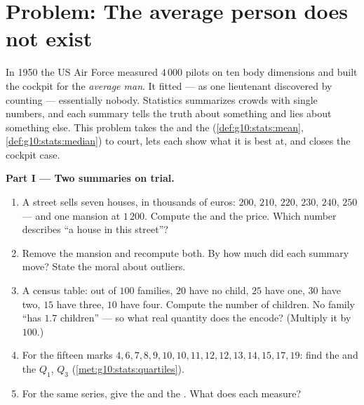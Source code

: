 \section{Problem: The average person does not exist}

\begin{problem}
\label{pb:g10:stats:1}
In 1950 the US Air Force measured $4\,000$ pilots on ten body
dimensions and built the cockpit for the \emph{average man}. It
fitted --- as one lieutenant discovered by counting --- essentially
nobody. Statistics summarizes crowds with single numbers, and each
summary tells the truth about something and lies about something
else. This problem takes the  and the 
(\cref{def:g10:stats:mean}, \cref{def:g10:stats:median}) to court,
lets each show what it is best at, and closes the cockpit case.

\medskip
\noindent\textbf{Part I --- Two summaries on trial.}
\begin{enumerate}
  \item A street sells seven houses, in thousands of euros:
        $200$, $210$, $220$, $230$, $240$, $250$ --- and one
        mansion at $1\,200$. Compute the  and the 
        price. Which number describes ``a house in this street''?
  \item Remove the mansion and recompute both. By how much did
        each summary move? State the moral about outliers.
  \item A census table: out of $100$ families, $20$ have no
        child, $25$ have one, $30$ have two, $15$ have three,
        $10$ have four. Compute the  number of children. No
        family ``has $1.7$ children'' --- so what real quantity
        does the  encode? (Multiply it by $100$.)
  \item For the fifteen marks
        $4, 6, 7, 8, 9, 10, 10, 11, 12, 12, 13, 14, 15, 17, 19$:
        find the  and the  $Q_1$, $Q_3$
        (\cref{met:g10:stats:quartiles}).
  \item For the same series, give the  and the
        . What does each measure?
\end{enumerate}


\end{problem}
